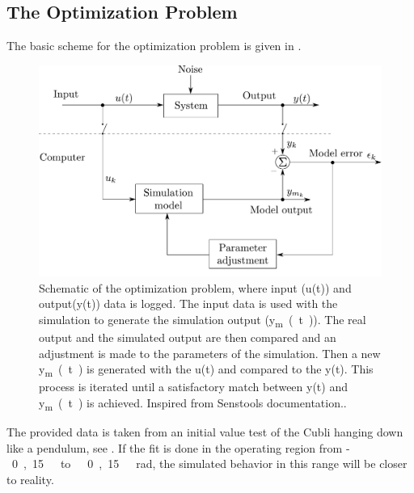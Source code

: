 \subsection{The Optimization Problem}
The basic scheme for the optimization problem is given in .
%
\begin{figure}[H]
	\centering
	\includegraphics[scale=0.4]{figures/senstoolsModelOptimizationHM}
%	
	\caption{Schematic of the optimization problem, where input (u(t)) and output(y(t)) data is logged. The input data is used with the simulation to generate the simulation output (\si{y_{m}(t)}). The real output and the simulated output are then compared and an adjustment is made to the parameters of the simulation. Then a new \si{y_{m}(t)} is generated with the u(t) and compared to the y(t). This process is iterated until a satisfactory match between y(t) and \si{y_{m}(t)} is achieved. Inspired from Senstools documentation.\cite{Senstools}.}
	\label{SensToolSchema}
\end{figure}
%
The provided data is taken from an initial value test of the Cubli hanging down like a pendulum, see .
If the fit is done in the operating region from \si{-0,15\ to\ 0,15\ rad}, the simulated behavior in this range will be closer to reality.

